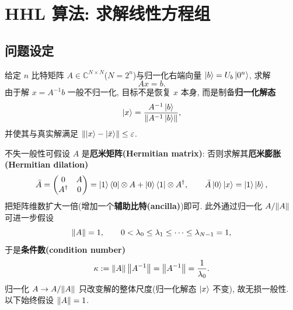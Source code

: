 \documentclass[utf8]{article} %
\numberwithin{equation}{section}   %
\newtheorem{Def}{\hskip 2em {\color{green} 定义}}[subsection]
\newtheorem{Note}{\hskip 2em {\color{red} 注}}[subsection]
\begin{document}
\section{HHL 算法: 求解线性方程组}

\subsection{问题设定}

\begin{Def}
    给定 $n$ 比特矩阵 $A \in \mathbb{C}^{N\times N}$($N = 2^n$)与归一化右端向量
    $\ket{b} = U_b \ket{0^n}$, 求解
    \begin{equation}
        A x = b.
    \end{equation}
    由于解 $x = A^{-1}b$ 一般不归一化, 目标不是恢复 $x$ 本身, 而是制备\textbf{归一化解态}
    \begin{equation}
        \ket{x} = \frac{A^{-1}\ket{b}}{\norm{A^{-1}\ket{b}}},
    \end{equation}
    并使其与真实解满足 $\norm{\ket{x} - \ket{\bar{x}}} \le \varepsilon$.
\end{Def}

\begin{Note}[厄米假设与膨胀]
    不失一般性可假设 $A$ 是\textbf{厄米矩阵(Hermitian matrix)}: 否则求解其\textbf{厄米膨胀(Hermitian dilation)}
    \begin{equation}
        \bar{A} = \begin{pmatrix} 0 & A \\ A^\dagger & 0 \end{pmatrix}
        = \ket{1}\bra{0}\otimes A + \ket{0}\bra{1}\otimes A^\dagger,
        \qquad
        \bar{A}\ket{0}\ket{x} = \ket{1}\ket{b},
    \end{equation}
    把矩阵维数扩大一倍(增加一个\textbf{辅助比特(ancilla)})即可. 此外通过归一化 $A/\norm{A}$ 可进一步假设
    \begin{equation}
        \norm{A} = 1, \qquad 0 < \lambda_0 \le \lambda_1 \le \dots \le \lambda_{N-1} = 1,
    \end{equation}
    于是\textbf{条件数(condition number)}
    \begin{equation}
        \kappa := \norm{A}\,\norm{A^{-1}} = \norm{A^{-1}} = \frac{1}{\lambda_0}.
    \end{equation}
    归一化 $A \to A/\norm{A}$ 只改变解的整体尺度(归一化解态 $\ket{x}$ 不变), 故无损一般性.
    以下始终假设 $\norm{A} = 1$.
\end{Note}
\end{document}
